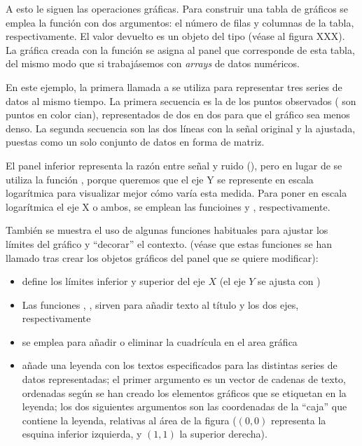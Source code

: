 A esto le siguen las operaciones gráficas. Para construir una tabla de gráficos se emplea la función  con dos argumentos: el número de filas y columnas de la tabla, respectivamente. El valor devuelto es un objeto del tipo  (véase al figura XXX). La gráfica creada con la función  se asigna al panel que corresponde de esta tabla, del mismo modo que si trabajásemos con \emph{arrays} de datos numéricos.

En este ejemplo, la primera llamada a  se utiliza para representar tres series de datos al mismo tiempo. La primera secuencia es la de los puntos observados ( son puntos en color cian), representados de dos en dos para que el gráfico sea menos denso. La segunda secuencia son las dos líneas con la señal original y la ajustada, puestas como un solo conjunto de datos en forma de matriz.

El panel inferior representa la razón entre señal y ruido (), pero en lugar de  se utiliza la función , porque queremos que el eje Y se represente en escala logarítmica para visualizar mejor cómo varía esta medida. Para poner en escala logarítmica el eje X o ambos, se emplean las funcioines  y , respectivamente.

También se muestra el uso de algunas funciones habituales para ajustar los límites del gráfico y ``decorar'' el contexto. (véase que estas funciones se han llamado tras crear los objetos gráficos del panel que se quiere modificar):

\begin{itemize}
  \item {} define los límites inferior y superior del eje $X$ (el eje $Y$ se ajusta con )
  \item Las funciones , ,  sirven para añadir texto al título y los dos ejes, respectivamente
  \item {} se emplea para añadir o eliminar la cuadrícula en el area gráfica
  \item {} añade una leyenda con los textos especificados para las distintas series de datos representadas; el primer argumento es un vector de cadenas de texto, ordenadas según se han creado los elementos gráficos que se etiquetan en la leyenda; los dos siguientes argumentos son las coordenadas de la ``caja'' que contiene la leyenda, relativas al área de la figura ($(0,0)$ representa la esquina inferior izquierda, y $(1,1)$ la superior derecha).
\end{itemize}

